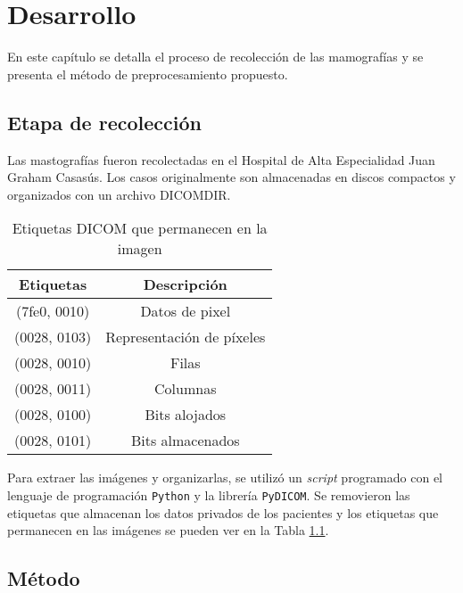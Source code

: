 \chapter{Desarrollo}
\label{desarrollo}

En este capítulo se detalla el proceso de recolección de las mamografías y se
presenta el método de preprocesamiento propuesto.

\section{Etapa de recolección}

Las mastografías fueron recolectadas en el Hospital de Alta Especialidad Juan
Graham Casasús. Los casos originalmente son almacenadas en discos compactos y
organizados con un archivo DICOMDIR. 

\begin{table}[h]
  \caption[Etiquetas DICOM]{Etiquetas DICOM que permanecen en la imagen} 
  \label{table:dicomtags}
\begin{center}
{\scriptsize
    \begin{tabular}{c|c}
    \hline

    {\bf Etiquetas} & 
    {\bf Descripción} \\
    \hline
        (7fe0, 0010) & Datos de pixel\\
        (0028, 0103) & Representación de píxeles \\
        (0028, 0010) & Filas \\
        (0028, 0011) & Columnas \\
        (0028, 0100) & Bits alojados \\
        (0028, 0101) & Bits almacenados \\
    \hline
    \end{tabular}
}
\end{center}
\end{table}

Para extraer las imágenes y organizarlas, se utilizó un \textit{script}
programado con el lenguaje de programación \texttt{Python} y la librería
\texttt{PyDICOM}. Se removieron las etiquetas que almacenan los datos privados de los pacientes y los etiquetas
que permanecen en las imágenes se pueden ver en la Tabla \ref{table:dicomtags}.

\section{Método}

